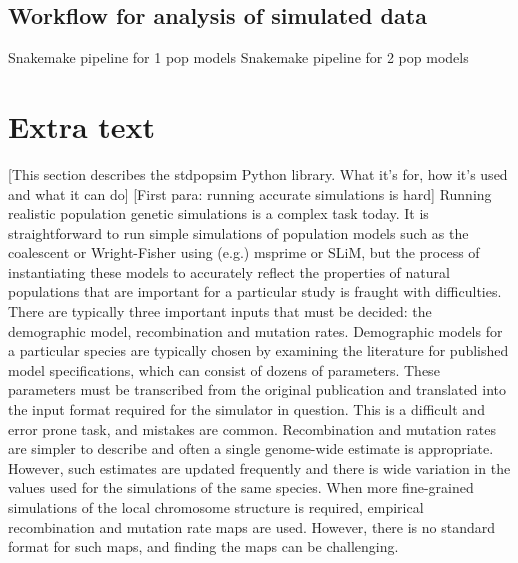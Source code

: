\documentclass[12pt,halfline,a4paper]{ouparticle}
\begin{document}
\subsection*{Workflow for analysis of simulated data}
Snakemake pipeline for 1 pop models
Snakemake pipeline for 2 pop models


\section*{Extra text}
[This section describes the stdpopsim Python library. What it’s for, how it’s used and what it can do]
[First para: running accurate simulations is hard]
Running realistic population genetic simulations is a complex task today. It is
straightforward to run simple simulations of population models such as the
coalescent or Wright-Fisher using (e.g.) msprime or SLiM, but the process of
instantiating these models to accurately reflect the properties of natural
populations that are important for a particular study is fraught with
difficulties. There are typically three important inputs that must be decided:
the demographic model, recombination and mutation rates. Demographic models for
a particular species are typically chosen by examining the literature for
published model specifications, which can consist of dozens of parameters. These
parameters must be transcribed from the original publication and translated into
the input format required for the simulator in question. This is a difficult and
error prone task, and mistakes are common. Recombination and mutation rates are
simpler to describe and often a single genome-wide estimate is appropriate.
However, such estimates are updated frequently and there is wide variation in
the values used for the simulations of the same species. When more fine-grained
simulations of the local chromosome structure is required, empirical
recombination and mutation rate maps are used. However, there is no standard
format for such maps, and finding the maps can be challenging.
\end{document}
